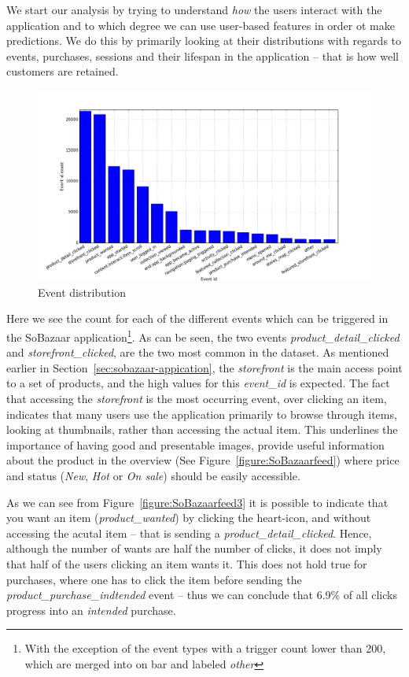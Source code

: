 We start our analysis by trying to understand \textit{how} the users interact
with the application and to which degree we can use user-based features in
order ot make predictions. We do this by primarily looking at their
distributions with regards to events, purchases, sessions and their lifespan in
the application -- that is how well customers are retained.

\begin{figure}[H]
  \includegraphics[width=5in]{image/event_iddistribution.png}
  \centering
  \caption{Event distribution}
\label{figure:eventIDDistribution}
\end{figure}

Here we see the count for each of the different events which can be triggered
in the SoBazaar application\footnote{With the exception of the event types with
a trigger count lower than 200, which are merged into on bar and labeled
\emph{other}}. As can be seen, the two events \emph{product\_detail\_clicked}
and \emph{storefront\_clicked}, are the two most common in the dataset. As
mentioned earlier in Section~\ref{sec:sobazaar-appication}, the
\emph{storefront} is the main access point to a set of products, and the high
values for this \emph{event\_id} is expected. The fact that accessing the
\emph{storefront} is the most occurring event, over clicking an item, indicates
that many users use the application primarily to browse through items, looking
at thumbnails, rather than accessing the actual item. This underlines the
importance of having good and presentable images, provide useful information
about the product in the overview (See Figure~\ref{figure:SoBazaarfeed}) where
price and status (\textit{New}, \textit{Hot} or \textit{On sale}) should be
easily accessible.

As we can see from Figure~\ref{figure:SoBazaarfeed3} it is possible to indicate
that you want an item (\textit{product\_wanted}) by clicking the heart-icon,
and without accessing the acutal item -- that is sending a
\textit{product\_detail\_clicked}. Hence, although the number of wants are half
the number of clicks, it does not imply that half of the users clicking an item
wants it. This does not hold true for purchases, where one has to click the
item before sending the \textit{product\_purchase\_indtended} event -- thus we
can conclude that 6.9\% of all clicks progress into an \textit{intended}
purchase.

